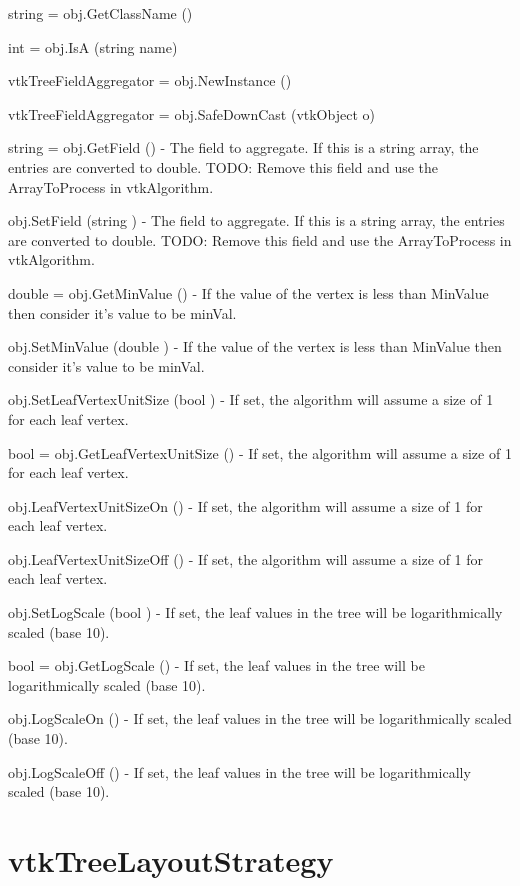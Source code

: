 \begin{DoxyItemize}
\item {\ttfamily string = obj.\-Get\-Class\-Name ()}  
\item {\ttfamily int = obj.\-Is\-A (string name)}  
\item {\ttfamily vtk\-Tree\-Field\-Aggregator = obj.\-New\-Instance ()}  
\item {\ttfamily vtk\-Tree\-Field\-Aggregator = obj.\-Safe\-Down\-Cast (vtk\-Object o)}  
\item {\ttfamily string = obj.\-Get\-Field ()} -\/ The field to aggregate. If this is a string array, the entries are converted to double. T\-O\-D\-O\-: Remove this field and use the Array\-To\-Process in vtk\-Algorithm.  
\item {\ttfamily obj.\-Set\-Field (string )} -\/ The field to aggregate. If this is a string array, the entries are converted to double. T\-O\-D\-O\-: Remove this field and use the Array\-To\-Process in vtk\-Algorithm.  
\item {\ttfamily double = obj.\-Get\-Min\-Value ()} -\/ If the value of the vertex is less than Min\-Value then consider it's value to be min\-Val.  
\item {\ttfamily obj.\-Set\-Min\-Value (double )} -\/ If the value of the vertex is less than Min\-Value then consider it's value to be min\-Val.  
\item {\ttfamily obj.\-Set\-Leaf\-Vertex\-Unit\-Size (bool )} -\/ If set, the algorithm will assume a size of 1 for each leaf vertex.  
\item {\ttfamily bool = obj.\-Get\-Leaf\-Vertex\-Unit\-Size ()} -\/ If set, the algorithm will assume a size of 1 for each leaf vertex.  
\item {\ttfamily obj.\-Leaf\-Vertex\-Unit\-Size\-On ()} -\/ If set, the algorithm will assume a size of 1 for each leaf vertex.  
\item {\ttfamily obj.\-Leaf\-Vertex\-Unit\-Size\-Off ()} -\/ If set, the algorithm will assume a size of 1 for each leaf vertex.  
\item {\ttfamily obj.\-Set\-Log\-Scale (bool )} -\/ If set, the leaf values in the tree will be logarithmically scaled (base 10).  
\item {\ttfamily bool = obj.\-Get\-Log\-Scale ()} -\/ If set, the leaf values in the tree will be logarithmically scaled (base 10).  
\item {\ttfamily obj.\-Log\-Scale\-On ()} -\/ If set, the leaf values in the tree will be logarithmically scaled (base 10).  
\item {\ttfamily obj.\-Log\-Scale\-Off ()} -\/ If set, the leaf values in the tree will be logarithmically scaled (base 10).  
\end{DoxyItemize}\hypertarget{vtkinfovis_vtktreelayoutstrategy}{}\section{vtk\-Tree\-Layout\-Strategy}\label{vtkinfovis_vtktreelayoutstrategy}
